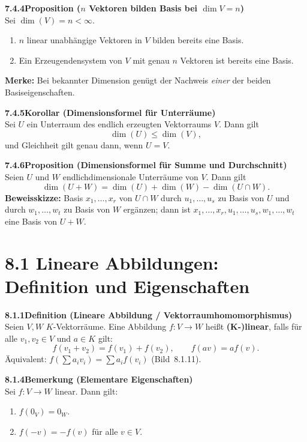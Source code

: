 \documentclass[a4paper,12pt]{article}
\newcommand{\gentry}[3]{%
  \noindent\textbf{#1\quad #2}\nopagebreak\\[0.2em]
  #3\par\smallskip
}
\begin{document}
\gentry{7.4.4}{Proposition ($n$ Vektoren bilden Basis bei $\dim V = n$)}{%
  Sei $\dim(V) = n < \infty$.
  \begin{enumerate}[label=(\alph*),topsep=2pt,itemsep=1pt]
    \item $n$ linear unabhängige Vektoren in $V$ bilden bereits eine Basis.
    \item Ein Erzeugendensystem von $V$ mit genau $n$ Vektoren ist bereits eine
          Basis.
  \end{enumerate}
  \textbf{Merke:} Bei bekannter Dimension genügt der Nachweis \emph{einer}
  der beiden Basiseigenschaften.
}

\gentry{7.4.5}{Korollar (Dimensionsformel für Unterräume)}{%
  Sei $U$ ein Unterraum des endlich erzeugten Vektorraums $V$. Dann gilt
  \[
    \dim(U) \le \dim(V),
  \]
  und Gleichheit gilt genau dann, wenn $U = V$.
}

\gentry{7.4.6}{Proposition (Dimensionsformel für Summe und Durchschnitt)}{%
  Seien $U$ und $W$ endlichdimensionale Unterräume von $V$. Dann gilt
  \[
    \dim(U + W) = \dim(U) + \dim(W) - \dim(U \cap W).
  \]
  \textbf{Beweisskizze:} Basis $x_1,\ldots,x_r$ von $U \cap W$ durch
  $u_1,\ldots,u_s$ zu Basis von $U$ und durch $w_1,\ldots,w_t$ zu Basis von
  $W$ ergänzen; dann ist $x_1,\ldots,x_r,u_1,\ldots,u_s,w_1,\ldots,w_t$ eine
  Basis von $U+W$.
}

\section*{8.1 \quad Lineare Abbildungen: Definition und Eigenschaften}

\gentry{8.1.1}{Definition (Lineare Abbildung / Vektorraumhomomorphismus)}{%
  Seien $V, W$ $K$-Vektorräume. Eine Abbildung $f: V \to W$ heißt
  \textbf{(K-)linear}, falls für alle $v_1,v_2 \in V$ und $a \in K$ gilt:
  \[
    f(v_1 + v_2) = f(v_1) + f(v_2), \qquad f(av) = af(v).
  \]
  Äquivalent: $f(\sum a_i v_i) = \sum a_i f(v_i)$ (Bild~8.1.11).
}

\gentry{8.1.4}{Bemerkung (Elementare Eigenschaften)}{%
  Sei $f: V \to W$ linear. Dann gilt:
  \begin{enumerate}[label=(\alph*),topsep=2pt,itemsep=1pt]
    \item $f(0_V) = 0_W$.
    \item $f(-v) = -f(v)$ für alle $v \in V$.
  \end{enumerate}
}
\end{document}
